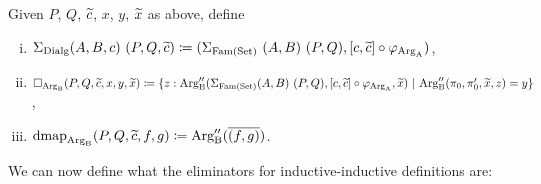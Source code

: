 \documentclass[orivec,envcountsame, ,envcountsect]{llncs}
\begin{document}
\begin{definition}
Given $P$, $Q$, $\widetilde{c}$, $x$, $y$, $\widetilde{x}$ as above, define
  \begin{enumerate}[(i)]
  \item $\Sigma_{\text{Dialg}} (A, B, c)\ (P, Q, \widetilde{c}) \coloneqq (\Sigma_{\text{Fam}(\text{Set})}\ (A,
    B)\ (P, Q), [c, \widetilde{c}] \circ \varphi_{\text{Arg}_{\text{A}}})$,
  \item $\Box_{\text{Arg}_{\text{B}}}(P, Q, \widetilde{c}, x, y, \widetilde{x}) \coloneqq \\
\{ z : \text{Arg}_{\text{B}}''(\Sigma_{\text{Fam}(\text{Set})} (A, B)\ (P, Q), [c, \widetilde{c}] \circ \varphi_{\text{Arg}_{\text{A}}}, \widetilde{x}
)\ |\ \text{Arg}_{\text{B}}''(\pi_0, \pi'_0, \widetilde{x}, z) = y \}$,
\item $\text{dmap}_{\text{Arg}_{\text{B}}}(P, Q, \widetilde{c}, f, g) \coloneqq \text{Arg}_{\text{B}}''(\overline{(f, g)})$.
  \end{enumerate}
\end{definition}
We can now define what the eliminators for inductive-inductive definitions are:
\end{document}
